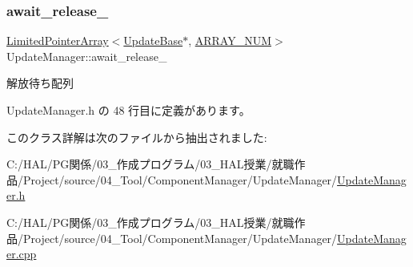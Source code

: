 \subsubsection{\texorpdfstring{await\+\_\+release\+\_\+}{await\_release\_}}
{\footnotesize\ttfamily \mbox{\hyperlink{class_limited_pointer_array}{Limited\+Pointer\+Array}}$<$\mbox{\hyperlink{class_update_base}{Update\+Base}}$\ast$, \mbox{\hyperlink{class_update_manager_a280b884fb6a025cfd92d4f93086c60c6}{A\+R\+R\+A\+Y\+\_\+\+N\+UM}}$>$ Update\+Manager\+::await\+\_\+release\+\_\+\hspace{0.3cm}{\ttfamily [private]}}



解放待ち配列 



 Update\+Manager.\+h の 48 行目に定義があります。



このクラス詳解は次のファイルから抽出されました\+:\begin{DoxyCompactItemize}
\item 
C\+:/\+H\+A\+L/\+P\+G関係/03\+\_\+作成プログラム/03\+\_\+\+H\+A\+L授業/就職作品/\+Project/source/04\+\_\+\+Tool/\+Component\+Manager/\+Update\+Manager/\mbox{\hyperlink{_update_manager_8h}{Update\+Manager.\+h}}\item 
C\+:/\+H\+A\+L/\+P\+G関係/03\+\_\+作成プログラム/03\+\_\+\+H\+A\+L授業/就職作品/\+Project/source/04\+\_\+\+Tool/\+Component\+Manager/\+Update\+Manager/\mbox{\hyperlink{_update_manager_8cpp}{Update\+Manager.\+cpp}}\end{DoxyCompactItemize}
